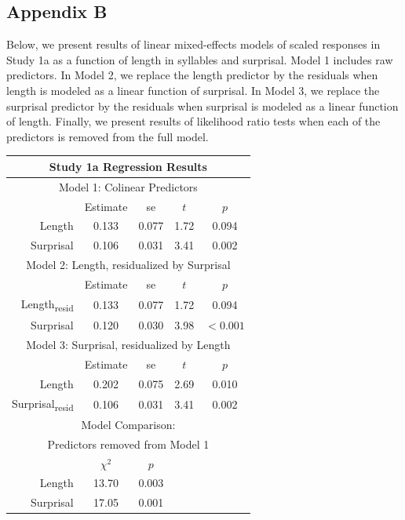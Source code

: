 \subsection{Appendix B}

Below, we present results of linear mixed-effects models of scaled responses in Study 1a as a function of length in syllables and surprisal.
Model 1 includes raw predictors.
In Model 2, we replace the length predictor by the residuals when length is modeled as a linear function of surprisal.
In Model 3, we replace the surprisal predictor by the residuals when surprisal is modeled as a linear function of length.
Finally, we present results of likelihood ratio tests when each of the predictors is removed from the full model.

\vspace{4mm}

\noindent
\footnotesize{
\begin{tabular}{r|cccc}
\hline
\hline
\multicolumn{5}{c}{\textbf{Study 1a Regression Results}} \\
\hline
\hline
\multicolumn{5}{c}{Model 1: Colinear Predictors} \\
& Estimate & se & $t$ & $p$ \\
\hline
Length & 0.133 & 0.077 & 1.72 & 0.094 \\
Surprisal & 0.106 & 0.031 & 3.41 & 0.002 \\
\hline
\hline
\multicolumn{5}{c}{Model 2: Length, residualized by Surprisal} \\
& Estimate & se & $t$ & $p$ \\
\hline
Length\textsubscript{resid} & 0.133 & 0.077 & 1.72 & 0.094 \\
Surprisal & 0.120 & 0.030 & 3.98 & $<0.001$ \\
\hline
\hline
\multicolumn{5}{c}{Model 3: Surprisal, residualized by Length} \\
& Estimate & se & $t$ & $p$ \\
\hline
Length & 0.202 & 0.075 & 2.69 & 0.010 \\
Surprisal\textsubscript{resid} & 0.106 & 0.031 & 3.41 & 0.002 \\
\hline
\hline
\multicolumn{5}{c}{Model Comparison:} \\
\multicolumn{5}{c}{Predictors removed from Model 1} \\
& $\chi^2$ & $p$ \\
\hline
Length & 13.70 & 0.003 \\
Surprisal & 17.05 & 0.001 \\
\hline
\hline
\end{tabular}
}



